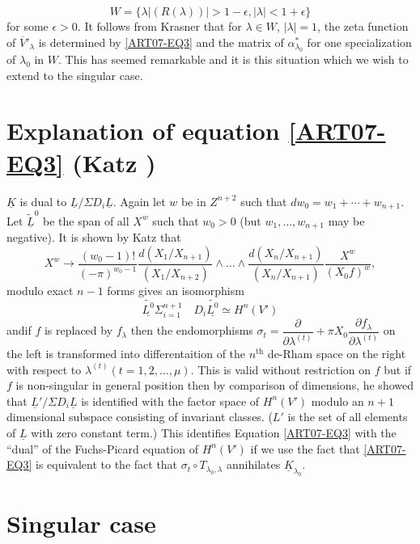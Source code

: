 \begin{equation}
W=\{\lambda|(R(\lambda))|>1-\epsilon, |\lambda|<1+\epsilon\}\label{art07-eq4}
\end{equation}
for some $\epsilon>0$. It follows from Krasner that for $\lambda\in W$, $|\lambda|=1$, the zeta function of $\overline{V}'_{\lambda}$ is determined by \eqref{ART07-EQ3} and the matrix of $\alpha^{*}_{\lambda_{0}}$ for one specialization of $\lambda_{0}$ in $W$. This has seemed remarkable and it is this situation which we wish to extend to the singular case.

\section{Explanation of equation \texorpdfstring{\eqref{ART07-EQ3}}{eq3} (Katz \texorpdfstring{\cite{ART07-KEY5}}{key5})}\label{art07-sec3}

$\underline{K}$ is dual to $\underline{L}/\Sigma D_{i}\underline{L}$. Again let $w$ be in $Z^{n+2}$ such that $dw_{0}=w_{1}+\cdots+w_{n+1}$. Let $\widetilde{\underline{L}}^{0}$ be the span of all $X^{w}$ such that $w_{0}>0$ (but $w_{1},\ldots,w_{n+1}$ may be negative). It is shown by Katz that
$$
X^{w}\to \dfrac{(w_{0}-1)!}{(-\pi)^{w_{0}-1}}\dfrac{d(X_{1}/X_{n+1})}{(X_{1}/X_{n+2})}\wedge\ldots\wedge\dfrac{d(X_{n}/X_{n+1})}{(X_{n}/X_{n+1})}\dfrac{X^{w}}{(X_{0}f)^{w}},
$$
modulo exact $n-1$ forms gives an isomorphism
$$
\widetilde{\underline{L^{0}}}\Sigma^{n+1}_{i=1}\quad D_{i}\widetilde{\underline{L^{0}}}\simeq H^{n}(V')
$$
and\pageoriginale if $f$ is replaced by $f_{\lambda}$ then the endomorphisms $\sigma_{t}=\dfrac{\partial}{\partial \lambda^{(t)}}+\pi X_{0}\dfrac{\partial f_{\lambda}}{\partial \lambda^{(t)}}$ on the left is transformed into differentaition of the $n^{\text{th}}$ de-Rham space on the right with respect to $\lambda^{(t)}(t=1,2,\ldots,\mu)$. This is valid without restriction on $f$ but if $f$ is non-singular in general position then by comparison of dimensions, he showed that $\underline{L}'/\Sigma D_{i}\underline{L}$ is identified with the factor space of $H^{n}(V')$ modulo an $n+1$ dimensional subspace consisting of invariant classes. ($L'$ is the set of all elements of $\underline{L}$ with zero constant term.) This identifies Equation \eqref{ART07-EQ3} with the ``dual'' of the Fuchs-Picard equation of $H^{n}(V')$ if we use the fact that \eqref{ART07-EQ3} is equivalent to the fact that $\sigma_{t}\circ T_{\lambda_{0},\lambda}$ annihilates $\underline{K}_{\lambda_{0}}$.

\section{Singular case \texorpdfstring{\cite{ART07-KEY3}}{key3}}\label{art07-sec4}

